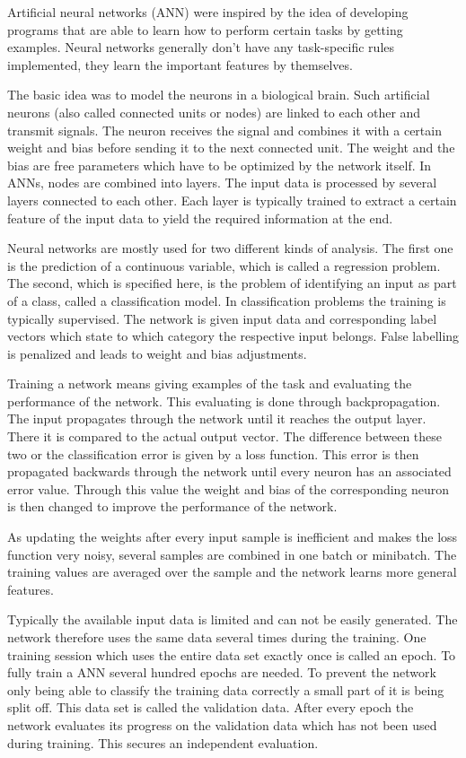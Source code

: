 Artificial neural networks (ANN) were inspired by the idea of developing programs that are able to learn how to perform certain tasks by getting examples. Neural networks generally don't have any task-specific rules implemented, they learn the important features by themselves. 

The basic idea was to model the neurons in a biological brain. Such artificial neurons (also called connected units or nodes) are linked to each other and transmit signals. The neuron receives the signal and combines it with a certain weight and bias before sending it to the next connected unit. The weight and the bias are free parameters which have to be optimized by the network itself. 
In ANNs, nodes are combined into layers. The input data is processed by several layers connected to each other. Each layer is typically trained to extract a certain feature of the input data to yield the required information at the end. 

Neural networks are mostly used for two different kinds of analysis. The first one is the prediction of a continuous variable, which is called a regression problem. The second, which is specified here, is the problem of identifying an input as part of a class, called a classification model.
In classification problems the training is typically supervised. The network is given input data and corresponding label vectors which state to which category the respective input belongs. False labelling is penalized and leads to weight and bias adjustments.

Training a network means giving examples of the task and evaluating the performance of the network. This evaluating is done through backpropagation. The input propagates through the network until it reaches the output layer. There it is compared to the actual output vector. The difference between these two or the classification error is given by a loss function. This error is then propagated backwards through the network until every neuron has an associated error value. Through this value the weight and bias of the corresponding neuron is then changed to improve the performance of the network. 

As updating the weights after every input sample is inefficient and makes the loss function very noisy, several samples are combined in one batch or minibatch. The training values are averaged over the sample and the network learns more general features. 

Typically the available input data is limited and can not be easily generated. The network therefore uses the same data several times during the training. One training session which uses the entire data set exactly once is called an epoch. To fully train a ANN several hundred epochs are needed. To prevent the network only being able to classify the training data correctly a small part of it is being split off. This data set is called the validation data. After every epoch the network evaluates its progress on the validation data which has not been used during training. This secures an independent evaluation.  

